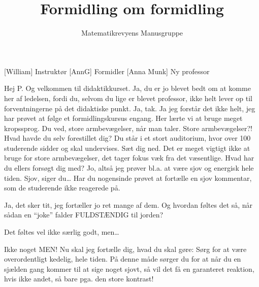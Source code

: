 \documentclass[a4paper,11pt]{article}
\title{Formidling om formidling}
\author{Matematikrevyens Manusgruppe}
\begin{document}
\maketitle

\begin{roles}
[William] Instruktør
[AnnG] Formidler
[Anna Munk] Ny professor
\end{roles}


  
\begin{sketch}
 Hej P. Og velkommen til didaktikkurset. 
Ja, du er jo blevet bedt om at komme her af ledelsen, fordi du, selvom du lige er blevet professor, ikke helt lever op til forventningerne på det didaktiske punkt.
 Ja, tak. Ja jeg forstår det ikke helt, jeg har prøvet at følge et formidlingskursus engang. Her lærte vi at bruge meget kropssprog. Du ved, store armbevægelser, når man taler.
 Store armbevægelser?! Hvad havde du selv forestillet dig? Du står i et stort auditorium, hvor over 100 studerende sidder og skal undervises. Sæt dig ned.
Det er meget vigtigt ikke at bruge for store armbevægelser, det tager fokus væk fra det væsentlige. Hvad har du ellers forsøgt dig med?
 Jo, altså jeg prøver bl.a. at være sjov og energisk hele tiden.
  Sjov, siger du… Har du nogensinde prøvet at fortælle en sjov kommentar, som de studerende ikke reagerede på.

 Ja, det sker tit, jeg fortæller jo ret mange af dem.
 Og hvordan føltes det så, når sådan en “joke” falder FULDSTÆNDIG til jorden?

 Det føltes vel ikke særlig godt, men…

 Ikke noget MEN! Nu skal jeg fortælle dig, hvad du skal gøre: Sørg for at være overordentligt kedelig, hele tiden. På denne måde sørger du for at når du en sjælden gang kommer til at sige noget sjovt, så vil det få en garanteret reaktion, hvis ikke andet, så bare pga. den store kontrast!


\end{sketch}
\end{document}
